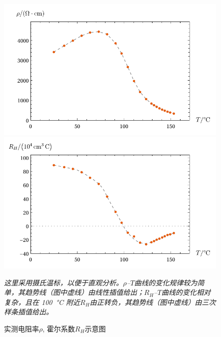 \documentclass[aps,pre,12pt,preprint,%
	onecolumn,showpacs,showkeys,nofootinbib]{revtex4-1}
\begin{document}
	\begin{figure}[p]
	\centering
	\includegraphics[width=.85\linewidth]{tempRhoPlot.pdf}\\
	\includegraphics[width=.85\linewidth]{tempHallPlot.pdf}
	\caption[实测图]{实测电阻率$\rho$, 霍尔系数$R_H$示意图}
	\vspace{1ex}
	\raggedright\small
	\textit{\hphantom{说明}
		这里采用摄氏温标，以便于直观分析。$\rho$--$T$曲线的变化规律较为简单，其趋势线（图中虚线）由线性插值给出；$R_H$--$T$曲线的变化相对复杂，且在 \SI{100}{\celsius} 附近$R_H$由正转负，其趋势线（图中虚线）由三次样条插值给出。
	\vspace{1ex}}
	\label{fig:rhoRhSimple}
	\end{figure}
	
\end{document}
